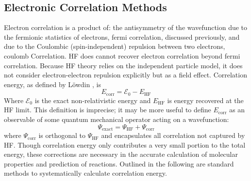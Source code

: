   \subsection{Electronic Correlation Methods}
    Electron correlation is a product of:  the antisymmetry of the wavefunction due to the fermionic statistics of electrons, fermi correlation, discussed previously, and due to the Coulombic (spin-independent) repulsion between two electrons, coulomb Correlation.\cite{Kutzelnigg2003}
    HF does cannot recover electron correlation beyond fermi correlation. Because HF theory relies on the independent particle model, it does not consider electron-electron repulsion explicitly but as a 
    field effect. Correlation energy, as defined by L{\"o}wdin \cite{Per-OlovLowdin1959}, is 
      \begin{equation} \label{corr_E}
      E_{\text{corr}} = \mathcal{E}_{0} - E_{\text{HF}}
      \end{equation}
    Where $\mathcal{E}_0$ is the exact non-relativistic energy and $E_{\text{HF}}$ is energy recovered at the HF limit. This definition is imprecise; it may be more useful to define $E_{\text{corr}}$ as an observable of some quantum mechanical operator acting on a wavefunction:
      \begin{equation}\label{psiex}
      \Psi_{\text{exact}} = \Psi_{\text{HF}} + \Psi_{\text{corr}}
      \end{equation}
    where $\Psi_{\text{corr}}$ is orthogonal to $\Psi_{\text{HF}}$ and encapsulates all correlation not captured by HF.\cite{Kong2012}  Though correlation energy only contributes a very small portion to the total energy, these corrections are necessary in the accurate calculation of molecular properties and prediction of reactions. Outlined in the following are standard methods to systematically calculate correlation energy.
